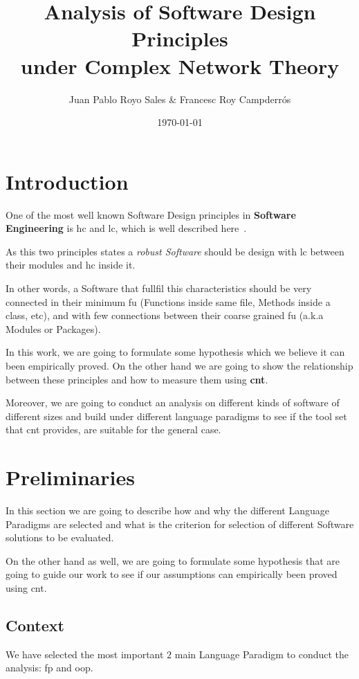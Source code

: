 \documentclass[12pt, a4paper]{article}
\title{%
      Analysis of Software Design Principles \\
      under Complex Network Theory\\
}
\author{Juan Pablo Royo Sales \& Francesc Roy Campderrós}
\affil{Universitat Politècnica de Catalunya}
\date\today
\begin{document}
\maketitle

\tableofcontents

\section{Introduction}
One of the most well known Software Design principles in \textbf{Software Engineering} is \acrfull{hc} and \acrfull{lc}, which is well described here~\cite{cohesion_coupling}.

As this two principles states a \textit{robust Software} should be design with \acrlong{lc} between their modules and \acrlong{hc} inside it. 

In other words, a Software that fullfil this characteristics should be very connected in their minimum \acrfull{fu} (Functions inside same file, Methods inside a class, etc), and with few connections between their coarse grained \acrshort{fu} (a.k.a Modules or Packages).

In this work, we are going to formulate some hypothesis which we believe it can been empirically proved. On the other hand we are going to show the relationship between these principles and how to measure them using \textbf{\acrfull{cnt}}.

Moreover, we are going to conduct an analysis on different kinds of software of different sizes and build under different language paradigms to see if the tool set that \acrshort{cnt} provides, are suitable for the general case. 

\section{Preliminaries}
In this section we are going to describe how and why the different Language Paradigms are selected and what is the criterion for selection of different Software solutions to be evaluated.

On the other hand as well, we are going to formulate some hypothesis that are going to guide our work to see if our assumptions can empirically been proved using \acrlong{cnt}.

\subsection{Context}
We have selected the most important $2$ main Language Paradigm to conduct the analysis: \acrfull{fp} and \acrfull{oop}. 
\end{document}
